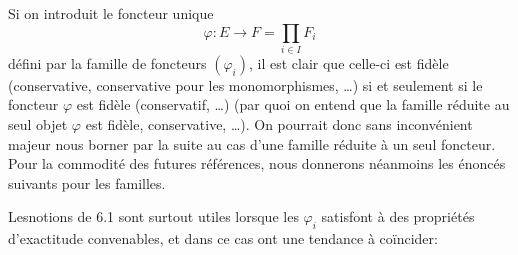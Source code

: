 \documentclass[10pt]{../fichiers-configuration-latex/smfart}
\begin{document}
\subsubsection{}
Si on introduit le foncteur unique
$$
\varphi:E\longrightarrow F=\prod_{i\in I} F_i
$$
défini par la famille de foncteurs $(\varphi_i)$, il est clair que
celle-ci est fidèle (\resp  conservative, \resp  conservative pour
les monomorphismes, \resp\ldots) si et seulement si le foncteur
$\varphi$ est fidèle (\resp  conservatif, \resp\ldots) (par quoi on
entend que la famille réduite au seul objet $\varphi$ est fidèle,
\resp  conservative, \resp\ldots). On pourrait donc sans
inconvénient majeur nous borner par la suite au cas d'une famille
réduite à un seul foncteur. Pour la commodité des futures
références, nous donnerons néanmoins les énoncés suivants pour les
familles.

Les\pageoriginale notions de 6.1 sont surtout utiles lorsque les
$\varphi_i$ satisfont à des propriétés d'exactitude convenables, et
dans ce cas ont une tendance à coïncider:
\end{document}
